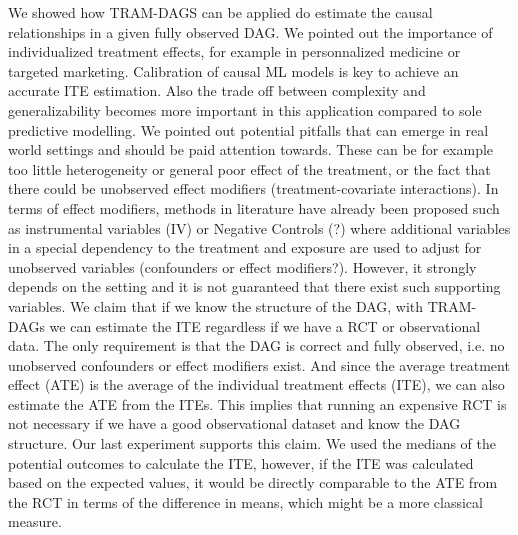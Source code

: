 We showed how TRAM-DAGS can be applied do estimate the causal relationships in a given fully observed DAG. We pointed out the importance of individualized treatment effects, for example in personnalized medicine or targeted marketing. Calibration of causal ML models is key to achieve an accurate ITE estimation. Also the trade off between complexity and generalizability becomes more important in this application compared to sole predictive modelling. We pointed out potential pitfalls that can emerge in real world settings and should be paid attention towards. These can be for example too little heterogeneity or general poor effect of the treatment, or the fact that there could be unobserved effect modifiers (treatment-covariate interactions). In terms of effect modifiers, methods in literature have already been proposed such as instrumental variables (IV) or Negative Controls (?) where additional variables in a special dependency to the treatment and exposure are used to adjust for unobserved variables (confounders or effect modifiers?). However, it strongly depends on the setting and it is not guaranteed that there exist such supporting variables. We claim that if we know the structure of the DAG, with TRAM-DAGs we can estimate the ITE regardless if we have a RCT or observational data. The only requirement is that the DAG is correct and fully observed, i.e. no unobserved confounders or effect modifiers exist. And since the average treatment effect (ATE) is the average of the individual treatment effects (ITE), we can also estimate the ATE from the ITEs. This implies that running an expensive RCT is not necessary if we have a good observational dataset and know the DAG structure. Our last experiment supports this claim. We used the medians of the potential outcomes to calculate the ITE, however, if the ITE was calculated based on the expected values, it would be directly comparable to the ATE from the RCT in terms of the difference in means, which might be a more classical measure. 
